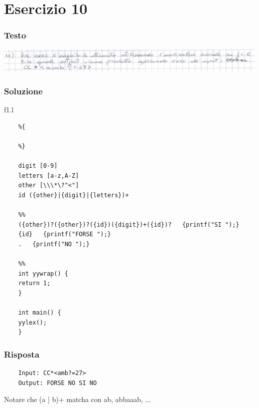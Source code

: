 \chapter{Esercizio 10}

\subsection{Testo}

\begin{center}
    \includegraphics[scale=0.2]{Chapters/Img/10text.png}\\
\end{center} 

\subsection{Soluzione}
f1.l
\begin{lstlisting}
    %{
    
    %}

    digit [0-9]
    letters [a-z,A-Z]
    other [\\\*\?"<"]
    id ({other}|{digit}|{letters})+

    %%
    ({other})?({other})?({id})({digit})+({id})?   {printf("SI ");}
    {id}   {printf("FORSE ");}
    .   {printf("NO ");}

    %%
    int yywrap() {
    return 1;
    }

    int main() {
    yylex();
    }
\end{lstlisting}

\subsection{Risposta}
\begin{lstlisting}
    Input: CC*<amb?=27> 
    Output: FORSE NO SI NO
\end{lstlisting}

Notare che (a | b)+ matcha con ab, abbaaab, ...